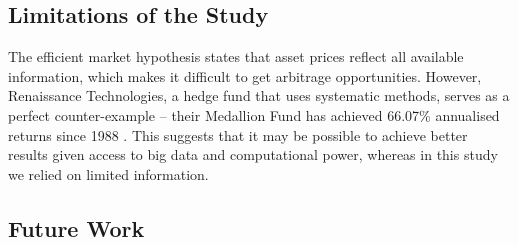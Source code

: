 \documentclass[a4paper, 11pt]{article}
\begin{document}
\subsection{Limitations of the Study}
The efficient market hypothesis states that asset prices reflect all available information, which makes it difficult to get arbitrage opportunities. However, Renaissance Technologies, a hedge fund that uses systematic methods, serves as a perfect counter-example -- their Medallion Fund has achieved 66.07\% annualised returns since 1988 \cite{cornell2020medallion}. This suggests that it may be possible to achieve better results given access to big data and computational power, whereas in this study we relied on limited information.

\subsection{Future Work}



\end{document}
